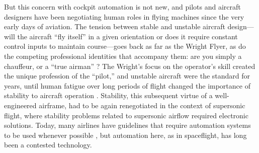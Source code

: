 
 But this concern with cockpit automation is not
new, and pilots and aircraft designers have been negotiating human
roles in flying machines since the very early days of aviation. The
tension between stable and unstable aircraft design---will the
aircraft ``fly itself'' in a given orientation or does it require
constant control inputs to maintain course---goes back as far as the
Wright Flyer, as do the competing professional identities that
accompany them: are you simply a chauffeur, or a ``true
airman'' \cite[p. 21]{DM}? The Wright's focus on the operator's
skill created the unique profession of the
``pilot,'' and unstable aircraft were the standard for years, until
human fatigue over long periods of flight changed the importance of
stability to aircraft operation \cite[p. 22-24]{DM}. Stability,
this subsequent virtue of a well-engineered airframe, had to be again
renegotiated in the context of supersonic flight, where stability
problems related to supersonic airflow required electronic
solutions. %
Today,
many airlines 
have guidelines that require automation systems to be used
whenever possible \cite[p. 38]{PARCCAST}, but automation here, as in
spaceflight, has long been a contested technology.

